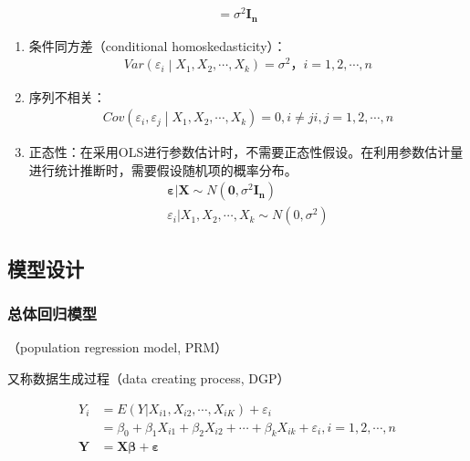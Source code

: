 \documentclass[12pt]{book}
\begin{document}
\begin{enumerate}[1.]
\begin{gather*}
              =\sigma^2\mathbf{I_n}
          \end{gather*}
          \begin{enumerate}[(1)]
              \item 条件同方差（conditional homoskedasticity）：
                    \begin{gather*}
                        Var\left(\varepsilon_i\middle| X_1,X_2,\cdots,X_k\right)=\sigma^2，i=1,2,\cdots,n
                    \end{gather*}
              \item 序列不相关：
                    \begin{gather*}
                        Cov\left (\varepsilon_i,\varepsilon_j\middle| X_1,X_2,\cdots,X_k\right)=0,i\neq j  i,j=1,2,\cdots,n
                    \end{gather*}
              \item 正态性：在采用OLS进行参数估计时，不需要正态性假设。在利用参数估计量进行统计推断时，需要假设随机项的概率分布。
                    \begin{gather*}
                        \bm{\varepsilon}|\mathbf{X}\sim N(\mathbf{0},\sigma^2\mathbf{I_n})\\
                        \varepsilon_i|X_1,X_2,\cdots,X_k\sim N(0,\sigma^2)
                    \end{gather*}
          \end{enumerate}
\end{enumerate}



\subsection{模型设计}

\subsubsection{总体回归模型}

（population regression model, PRM）

又称数据生成过程（data creating process, DGP）

\begin{align*}
Y_{i} &= E(Y|X_{i1},X_{i2},\cdots,X_{iK})+\varepsilon_{i}\\ 
&=\beta_{0} + \beta_{1}X_{i1}+\beta_{2}X_{i2}+\cdots+\beta_{k}X_{ik}+\varepsilon_{i}, i=1,2,⋯,n\\ 
\bm{Y}&=\bm{X\beta}+\bm{\varepsilon}
\end{align*}
\end{document}
